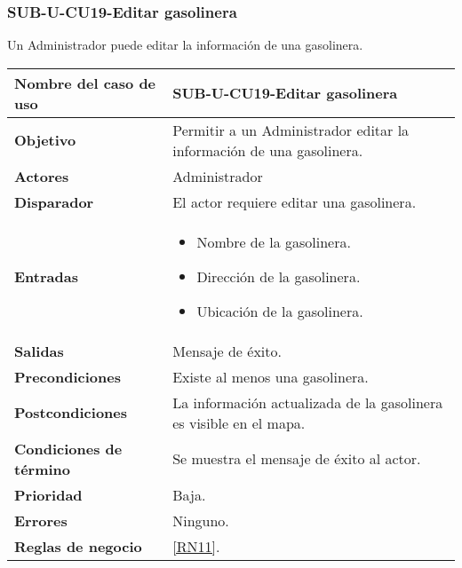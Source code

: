 \subsubsection{SUB-U-CU19-Editar gasolinera}\label{SUB-U-CU19}
Un Administrador puede editar la información de una gasolinera.

\begin{longtable}{|J{5cm}|J{10.3cm}|}
	\hline
	\textbf{Nombre del caso de uso} &
		SUB-U-CU19-Editar gasolinera \\ \hline
	\textbf{Objetivo} &
		Permitir a un Administrador editar la información de una gasolinera. \\ \hline
	\textbf{Actores} &
		Administrador \\ \hline 
	\textbf{Disparador} & 
		El actor requiere editar una gasolinera. \\ \hline 
	\textbf{Entradas} & 
		\begin{itemize}
				\item Nombre de la gasolinera.
				\item Dirección de la gasolinera.
				\item Ubicación de la gasolinera.
		\end{itemize}\\ \hline 
	\textbf{Salidas} & Mensaje de éxito.
		\\ \hline
	\textbf{Precondiciones} & Existe al menos una gasolinera.
		\\ \hline
	\textbf{Postcondiciones} & La información actualizada de la gasolinera es visible en el mapa.
		\\ \hline
	\textbf{Condiciones de término} & Se muestra el mensaje de éxito al actor.
		\\ \hline 
	\textbf{Prioridad} & 
		Baja. \\ \hline
	\textbf{Errores} & Ninguno.
		\\ \hline
	\textbf{Reglas de negocio} &  \ref{RN11}.
		 \\ \hline
\end{longtable}

